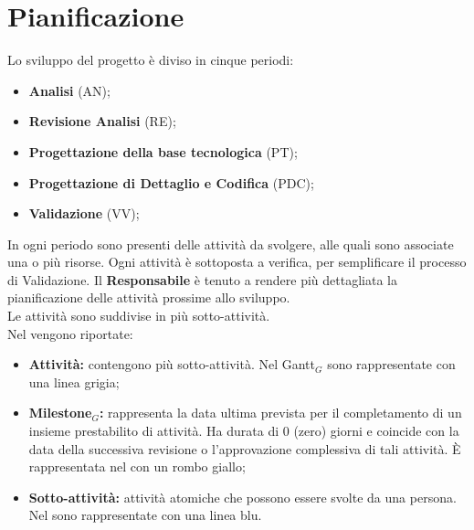 \chapter{Pianificazione}
Lo sviluppo del progetto è diviso in cinque periodi:
\begin{itemize}
    \item \textbf{Analisi} (AN);
    \item \textbf{Revisione Analisi} (RE);
    \item \textbf{Progettazione della base tecnologica} (PT);
    \item \textbf{Progettazione di Dettaglio e Codifica} (PDC);
    \item \textbf{Validazione} (VV);
\end{itemize}
In ogni periodo sono presenti delle attività da svolgere, alle quali sono associate una o più risorse. Ogni attività è sottoposta a verifica, per semplificare il processo di Validazione. Il \textbf{Responsabile} è tenuto a rendere più dettagliata la pianificazione delle attività prossime allo sviluppo.\\
Le attività sono suddivise in più sotto-attività.\\
Nel  vengono riportate:
\begin{itemize}
    \item \textbf{Attività:} contengono più sotto-attività. Nel Gantt$_{G}$ sono rappresentate con una linea grigia;
    \item \textbf{Milestone$_{G}$:} rappresenta la data ultima prevista per il completamento di un insieme prestabilito di attività. Ha durata di 0 (zero) giorni e coincide con la data della successiva revisione o l'approvazione complessiva di tali attività. È rappresentata nel  con un rombo giallo;
    \item \textbf{Sotto-attività:} attività atomiche che possono essere svolte da una persona. Nel  sono rappresentate con una linea blu.  
\end{itemize}
